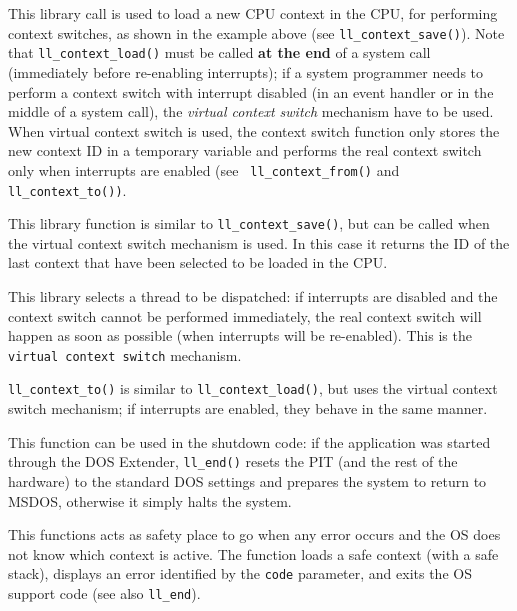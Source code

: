 \documentclass[a4paper]{report}
\begin{document}
This library call is used to load a new CPU context in the CPU, for
performing context switches, as shown in the example above (see
{\tt ll\_context\_save()}). Note that {\tt ll\_context\_load()} must
be called {\bf at the end} of a system call (immediately before re-enabling
interrupts); if a system programmer needs to perform a context switch
with interrupt disabled (in an event handler or in the middle of a
system call), the {\em virtual context switch} mechanism have to be used.
When virtual context switch is used, the context switch function only
stores the new context ID in a temporary variable and performs the
real context switch only when interrupts are enabled (see {\tt
ll\_context\_from()} and {\tt ll\_context\_to())}.


This library function is similar to {\tt ll\_context\_save()}, but
can be called when the virtual context switch mechanism is used. In
this case it returns the ID of the last context that have been
selected to be loaded in the CPU.


This library selects a thread to be dispatched: if interrupts are
disabled and the context switch cannot be performed immediately, the
real context switch will happen as soon as possible (when interrupts
will be re-enabled). This is the {\tt virtual context switch}
mechanism.

{\tt ll\_context\_to()} is similar to {\tt ll\_context\_load()}, but
uses the virtual context switch mechanism; if interrupts are enabled,
they behave in the same manner.


This function can be used in the shutdown code: if the application
was started through the DOS Extender, {\tt ll\_end()} resets the PIT
(and the rest of the hardware) to the standard DOS settings and
prepares the system to return to MSDOS, otherwise it simply halts the
system.


This functions acts as safety place to go when any error occurs and
the OS does not know which context is active. The function loads a
safe context (with a safe stack), displays an error identified by
the {\tt code} parameter, and exits the OS support code
(see also {\tt ll\_end}).

\end{document}
